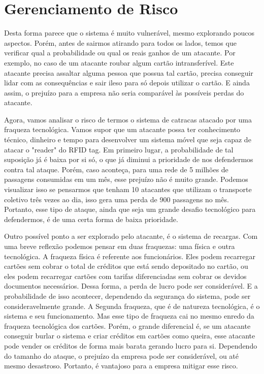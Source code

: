 \documentclass[openany]{ufsctex/ufsctex}
\begin{document}
	
	
	

   \chapter{Gerenciamento de Risco}
  
   Desta forma parece que o sistema é muito vulnerável, mesmo explorando poucos aspectos. Porém, antes de sairmos atirando para todos os lados, temos que verificar qual a probabilidade ou qual os reais ganhos de um atacante. Por exemplo, no caso de um atacante roubar algum cartão intransferível. Este atacante precisa assaltar alguma pessoa que possua tal cartão, precisa conseguir lidar com as consequências e sair ileso para só depois utilizar o cartão. E ainda assim, o prejuízo para a empresa não seria comparável às possíveis perdas do atacante.
  
  
   Agora, vamos analisar o risco de termos o sistema de catracas atacado por uma fraqueza tecnológica. Vamos supor que um atacante possa ter conhecimento técnico, dinheiro e tempo para desenvolver um sistema móvel que seja capaz de atacar o "reader" do RFID tag. Em primeiro lugar, a probabilidade de tal suposição já é baixa por si só, o que já diminui a prioridade de nos defendermos contra tal ataque. Porém, caso aconteça, para uma rede de 5 milhões de passagens consumidas em um mês, esse prejuízo não é muito grande. Podemos visualizar isso se pensarmos que tenham 10 atacantes que utilizam o transporte coletivo três vezes ao dia, isso gera uma perda de 900 passagens no mês. Portanto, esse tipo de ataque, ainda que seja um grande desafio tecnológico para defendermos, é de uma certa forma de baixa prioridade.

	
Outro possível ponto a ser explorado pelo atacante, é o sistema de recargas. Com uma breve reflexão podemos pensar em duas fraquezas: uma física e outra tecnológica. A fraqueza física é referente aos funcionários. Eles podem recarregar cartões sem cobrar o total de créditos que está sendo depositado no cartão, ou eles podem recarregar cartões com tarifas diferenciadas sem cobrar os devidos documentos necessários. Dessa forma, a perda de lucro pode ser considerável. E a probabilidade de isso acontecer, dependendo da segurança do sistema, pode ser consideravelmente grande. A Segunda fraqueza, que é de natureza tecnológica, é o sistema e seu funcionamento. Mas esse tipo de fraqueza cai no mesmo enredo da fraqueza tecnológica dos cartões. Porém, o grande diferencial é, se um atacante conseguir burlar o sistema e criar créditos em cartões como queira, esse atacante pode vender os créditos de forma mais barata gerando lucro para si. Dependendo do tamanho do ataque, o prejuízo da empresa pode ser considerável, ou até mesmo desastroso. Portanto, é vantajoso para a empresa mitigar esse risco. 
\end{document}
